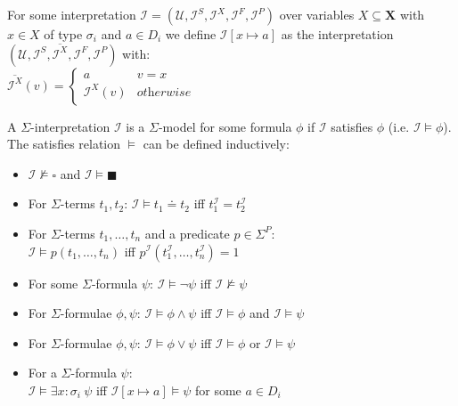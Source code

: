 \begin{definition}[Substitution]
For some interpretation $\mathcal{I}=\left(\mathcal{U},\mathcal{I}^S, \mathcal{I}^X, \mathcal{I}^F, \mathcal{I}^P\right)$ over variables $X\subseteq\mathbf{X}$ with $x\in X$ of type $\sigma_i$ and $a\in D_i$ we define $\mathcal{I}\left[x\mapsto a\right]$ as the interpretation $\left(\mathcal{U},\mathcal{I}^S, \overline{\mathcal{I}^X}, \mathcal{I}^F, \mathcal{I}^P\right)$ with:\\
$\overline{\mathcal{I}^X}(v)=
\begin{cases}
a & v=x\\
\mathcal{I}^X(v) & \textit{otherwise}
\end{cases}$
\end{definition}

\begin{definition}
A $\Sigma$-interpretation $\mathcal{I}$ is a $\Sigma$-model for some formula $\phi$ if $\mathcal{I}$ satisfies $\phi$ (i.e. $\mathcal{I}\vDash\phi$).\\
The satisfies relation $\vDash$ can be defined inductively:
\begin{itemize}
    \item $\mathcal{I} \nvDash \square$ and $\mathcal{I} \vDash \blacksquare$
    \item For $\Sigma$-terms $t_1, t_2$: 
    $\mathcal{I}\vDash t_1\doteq t_2$ iff $t_1^\mathcal{I}=t_2^\mathcal{I}$ 
    \item For $\Sigma$-terms $t_1,\dots,t_n$ and a predicate $p\in\Sigma^P$:\\
    $\mathcal{I}\vDash p\left(t_1,\dots,t_n\right)$ iff $p^\mathcal{I}(t_1^\mathcal{I},\dots,t^\mathcal{I}_n)=1$ 
    \item For some $\Sigma$-formula $\psi$:
    $\mathcal{I}\vDash \neg\psi$ iff $\mathcal{I} \nvDash \psi$
    \item For $\Sigma$-formulae $\phi, \psi$:
    $\mathcal{I}\vDash \phi\land\psi$ iff $\mathcal{I}\vDash\phi$ and $\mathcal{I}\vDash\psi$
    \item For $\Sigma$-formulae $\phi, \psi$:
    $\mathcal{I}\vDash \phi\lor\psi$ iff $\mathcal{I}\vDash\phi$ or $\mathcal{I}\vDash\psi$ 
    \item For a $\Sigma$-formula $\psi$:\\
    $\mathcal{I}\vDash \exists x\colon\!\sigma_i\ \psi$ iff $\mathcal{I}\left[x\mapsto a\right] \vDash \psi$ for some $a\in D_i$
\end{itemize}
\end{definition}

